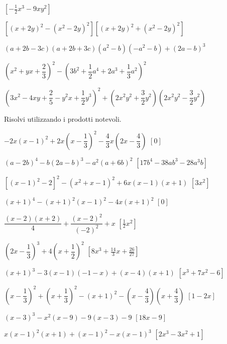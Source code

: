 \begin{esercizio}[\Ast]
\begin{enumeratea}
  \hfill $\left[-\frac{1}{2}x^{3}-9xy^{2}\right]$
 \item 
$\left[\left(x+2y\right)^{2}-\left(x^{2}-2y\right)^{2}\right]\left[
\left(x+2y\right)^{2}+\left(x^{2}-2y\right)^{2}\right]$
 \item $(a+2b-3c)(a+2b+3c)\left(a^{2}-b\right)\left(-a^{2}-b\right)+(2a-b)^{3}$
 \item 
$\left(x^{2}+yx+\dfrac{2}{3}\right)^{2}-\left(3b^{2}+\dfrac{1}{2}a^{4}+2a^{3}
+\dfrac{1}{3}a^{2}\right)^{2}$
 \item 
$\left(3x^{2}-4{xy}+\dfrac{2}{5}-y^{2}x+\dfrac{1}{2}y^{3}\right)^{2}+\left(2x^{2
}y^{2}+\dfrac{3}{2}y^{2}\right)\left(2x^{2}y^{2}-\dfrac{3}{2}y^{2}\right)$
 \end{enumeratea}
\end{esercizio}

\begin{esercizio}[\Ast]
 \label{ese:11.35}
Risolvi utilizzando i prodotti notevoli.
 \begin{enumeratea}
 \item 
$-2x(x-1)^{2}+2x\left(x-\dfrac{1}{3}\right)^{2}-\dfrac{4}{3}x\left(2x-\dfrac{4}{
3}\right)$
  \hfill $\left[0\right]$
 \item $(a-2b)^{4}-b(2a-b)^{3}-a^{2}(a+6b)^{2}$
  \hfill $\left[17b^{4}-38{ab}^{3}-28a^{3}b\right]$
 \item $[(x-1)^2-2]^2-\left(x^2+x-1\right)^2+6x(x-1)(x+1)$
  \hfill $\left[3x^{2}\right]$
 \item $(x+1)^{4}-(x+1)^{2}(x-1)^{2}-4x(x+1)^{2}$
  \hfill $\left[0\right]$
 \item $\dfrac{(x-2)(x+2)}{4}+\dfrac{(x-2)^{2}}{(-2)^{2}}+x$
  \hfill $\left[\frac{1}{2}x^{2}\right]$
 \item $\left(2x-\dfrac{1}{3}\right)^{3}+4\left(x+\dfrac{1}{2}\right)^{2}$
  \hfill $\left[8x^{3}+\frac{14}{3}x+\frac{26}{27}\right]$
 \item $(x+1)^{3}-3(x-1)(-1-x)+(x-4)(x+1)$
  \hfill $\left[x^{3}+7x^{2}-6\right]$
 \item 
$\left(x-\dfrac{1}{3}\right)^{2}+\left(x+\dfrac{1}{3}\right)^{2}-(x+1)^{2}
-\left(x-\dfrac{4}{3}\right)\left(x+\dfrac{4}{3}\right)$
  \hfill $\left[1-2x\right]$
 \item $(x-3)^{3}-x^{2}(x-9)-9(x-3)-9$
  \hfill $\left[18x-9\right]$
 \item $x(x-1)^{2}(x+1)+(x-1)^{2}-x(x-1)^{3}$
  \hfill $\left[2x^3-3x^2+1\right]$
% 

\end{enumeratea}
\end{esercizio}

